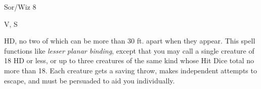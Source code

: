 
\begin{description*}
\item[Level:] Sor/Wiz 8
\item[Components:] V, S
\end{description*}

HD, no two of which can be more than 30 ft. apart when they appear.
This spell functions like \textit{lesser planar binding}, except that you may call
a single creature of 18 HD or less, or up to three creatures of the same kind whose
Hit Dice total no more than 18. Each creature gets a saving throw, makes independent
attempts to escape, and must be persuaded to aid you individually.